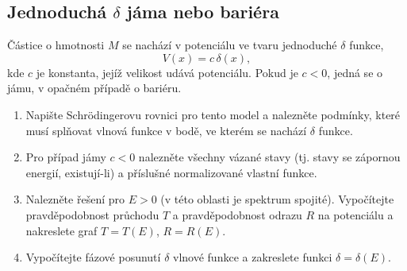 \subsection{Jednoduchá $\delta$ jáma nebo bariéra}
\label{sec:Delta}
Částice o hmotnosti $M$ se nachází v potenciálu ve tvaru jednoduché $\delta$ funkce,
\begin{equation}
	V(x)=c\,\delta(x),
\end{equation} 
kde $c$ je konstanta, jejíž velikost udává  potenciálu.
Pokud je $c<0$, jedná se o jámu, v opačném případě o bariéru.

\begin{enumerate}
\item 
    Napište Schrödingerovu rovnici pro tento model a nalezněte podmínky, které musí splňovat vlnová funkce v bodě, ve kterém se nachází $\delta$ funkce.

\item 
    Pro případ jámy $c<0$ nalezněte všechny vázané stavy (tj. stavy se zápornou energií, existují-li) a příslušné normalizované vlastní funkce.

\item 
    Nalezněte řešení pro $E>0$ (v této oblasti je spektrum spojité).
    Vypočítejte pravděpodobnost průchodu $T$ a pravděpodobnost odrazu $R$ na potenciálu a nakreslete graf $T=T(E)$, $R=R(E)$.

\item 
    Vypočítejte fázové posunutí $\delta$ vlnové funkce a zakreslete funkci $\delta=\delta(E)$.
\end{enumerate}

